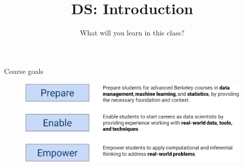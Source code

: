 \documentclass[aspectratio=169]{../latex_main/tntbeamer}  %
\title[Introduction]{DS: Introduction}
\subtitle{What will you learn in this class?}
\begin{document}
	
	\maketitle
	
	\begin{frame}{Course goals}
	    \begin{figure}
	        \centering
	        \includegraphics[scale=.4]{bild21}
	    \end{figure}
	\end{frame}
	
\end{document}
